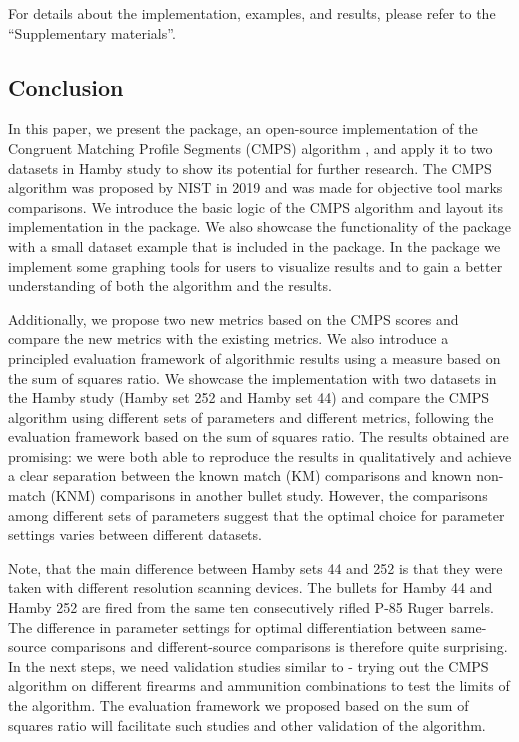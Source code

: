 For details about the implementation, examples, and results, please
refer to the ``Supplementary materials''.

\hypertarget{conclusion}{%
\subsection{Conclusion}\label{conclusion}}

In this paper, we present the  package, an open-source
implementation of the Congruent Matching Profile Segments (CMPS)
algorithm \citep{cmps}, and apply it to two datasets in Hamby study
\citep{hamby} to show its potential for further research. The CMPS
algorithm was proposed by NIST in 2019 and was made for objective tool
marks comparisons. We introduce the basic logic of the CMPS algorithm
and layout its implementation in the  package. We also
showcase the functionality of the  package with a small
dataset example that is included in the package. In the 
package we implement some graphing tools for users to visualize results
and to gain a better understanding of both the algorithm and the
results.

Additionally, we propose two new metrics based on the CMPS scores and
compare the new metrics with the existing metrics. We also introduce a
principled evaluation framework of algorithmic results using a measure
based on the sum of squares ratio. We showcase the implementation with
two datasets in the Hamby study (Hamby set 252 and Hamby set 44) and
compare the CMPS algorithm using different sets of parameters and
different metrics, following the evaluation framework based on the sum
of squares ratio. The results obtained are promising: we were both able
to reproduce the results in \citet{cmps} qualitatively and achieve a
clear separation between the known match (KM) comparisons and known
non-match (KNM) comparisons in another bullet study. However, the
comparisons among different sets of parameters suggest that the optimal
choice for parameter settings varies between different datasets.

Note, that the main difference between Hamby sets 44 and 252 is that
they were taken with different resolution scanning devices. The bullets
for Hamby 44 and Hamby 252 are fired from the same ten consecutively
rifled P-85 Ruger barrels. The difference in parameter settings for
optimal differentiation between same-source comparisons and
different-source comparisons is therefore quite surprising. In the next
steps, we need validation studies similar to \citet{vanderplas} - trying
out the CMPS algorithm on different firearms and ammunition combinations
to test the limits of the algorithm. The evaluation framework we
proposed based on the sum of squares ratio will facilitate such studies
and other validation of the algorithm.

